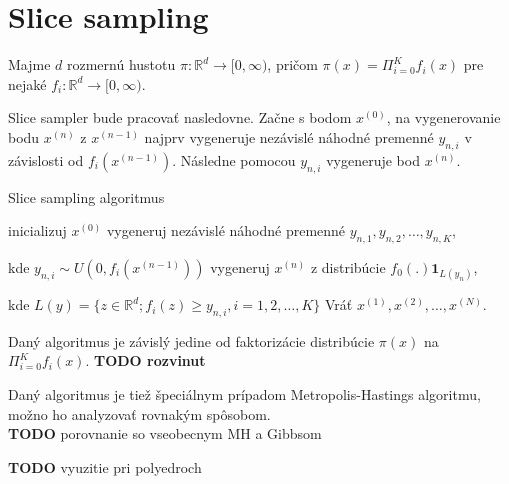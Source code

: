 \section{Slice sampling}

Majme $d$ rozmernú hustotu $\pi: \mathbb{R}^d \rightarrow [0,\infty)$, pričom $\pi(x) = \Pi^K_{i=0}f_i(x)$ pre nejaké $f_i: \mathbb{R}^d \rightarrow [0,\infty)$.

Slice sampler bude pracovať nasledovne. Začne s bodom $x^{(0)}$, na vygenerovanie bodu $x^{(n)}$ z $x^{(n-1)}$ najprv vygeneruje nezávislé náhodné premenné $y_{n,i}$ v závislosti od $f_i(x^{(n-1)})$. Následne pomocou $y_{n,i}$ vygeneruje bod $x^{(n)}$.

\begin{algorithm}[H]
	\caption{Slice sampling algoritmus \cite{slice_convergence_roberts}}
	\label{slice}
	\begin{algorithmic}[1]
		\State inicializuj $x^{(0)}$
			\State vygeneruj nezávislé náhodné premenné $y_{n,1},y_{n,2},\dots, y_{n,K}$,

			kde $y_{n,i} \sim U(0,f_i(x^{(n-1)}))$
			\State vygeneruj $x^{(n)}$ z distribúcie $f_0(.)\mathbf{1}_{L(y_{n})}$,

			kde $L(y)= \{ z \in \mathbb{R}^d; f_i(z) \geq y_{n,i}, i=1,2, \dots, K\}$
		\EndFor
		\State Vráť ${x^{(1)},x^{(2)},\dots,x^{(N)}}$.
	\end{algorithmic}
\end{algorithm}

Daný algoritmus je závislý jedine od faktorizácie distribúcie $\pi(x)$ na $\Pi^K_{i=0}f_i(x)$. \textbf{TODO rozvinut}

Daný algoritmus je tiež špeciálnym prípadom Metropolis-Hastings algoritmu, možno ho analyzovať rovnakým spôsobom.\\

\textbf{TODO} porovnanie so vseobecnym MH a Gibbsom

\textbf{TODO} vyuzitie pri polyedroch
